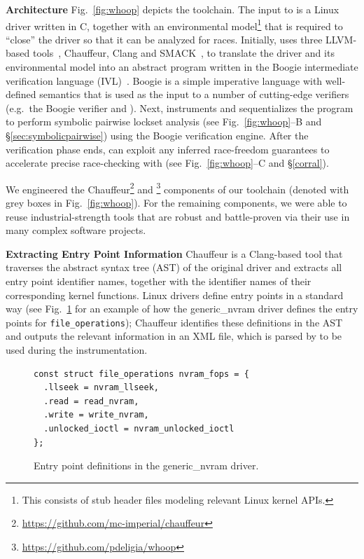 \noindent\textbf{Architecture }
%
Fig.~\ref{fig:whoop} depicts the \whoop toolchain. The input to \whoop is a Linux driver written in C, together with an environmental model\footnote{This consists of stub header files modeling relevant Linux kernel APIs.} that is required to ``close'' the driver so that it can be analyzed for races. Initially, \whoop uses three LLVM-based tools~\cite{lattner2004llvm}, Chauffeur, Clang and SMACK~\cite{rakamaric2014smack}, to translate the driver and its environmental model into an abstract program written in the Boogie intermediate verification language (IVL)~\cite{deline2005boogiepl}.  Boogie is a simple imperative language with well-defined semantics that is used as the input to a number of cutting-edge verifiers (e.g.\ the Boogie verifier and \corral). Next, \whoop instruments and sequentializes the program to perform symbolic pairwise lockset analysis (see Fig.~\ref{fig:whoop}--B and \S\ref{sec:symbolicpairwise}) using the Boogie verification engine. After the verification phase ends, \whoop can exploit any inferred race-freedom guarantees to accelerate precise race-checking with \corral (see Fig.~\ref{fig:whoop}--C and \S\ref{corral}).

We engineered the Chauffeur\footnote{\url{https://github.com/mc-imperial/chauffeur}} and \whoop\footnote{\url{https://github.com/pdeligia/whoop}} components of our toolchain (denoted with grey boxes in Fig.~\ref{fig:whoop}).  For the remaining components, we were able to reuse industrial-strength tools that are robust and battle-proven via their use in many complex software projects.

\noindent\textbf{Extracting Entry Point Information }
%
Chauffeur is a Clang-based tool that traverses the abstract syntax tree (AST) of the original driver and extracts all entry point identifier names, together with the identifier names of their corresponding kernel functions. Linux drivers define entry points in a standard way (see Fig.~\ref{fig:entrypoints} for an example of how the generic\_nvram driver defines the entry points for \texttt{file\_operations}); Chauffeur identifies these definitions in the AST and outputs the relevant information in an XML file, which is parsed by \whoop to be used during the instrumentation.

\begin{figure}[t]
\begin{lstlisting}
const struct file_operations nvram_fops = {
  .llseek = nvram_llseek,
  .read = read_nvram,
  .write = write_nvram,
  .unlocked_ioctl = nvram_unlocked_ioctl
};
\end{lstlisting}
\vspace{-2mm}
\caption{Entry point definitions in the generic\_nvram driver.}
\label{fig:entrypoints}
\end{figure}

